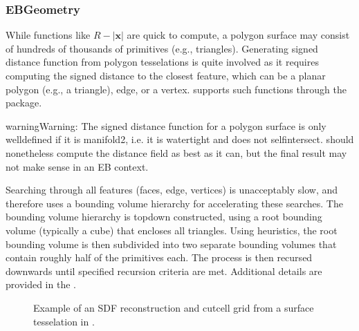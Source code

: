 \documentclass[letterpaper,10pt,english]{sphinxmanual}
\let\sphinxpxdimen\pdfpxdimen\else\newdimen\sphinxpxdimen
\begin{document}
\subsubsection{EBGeometry}
\label{\detokenize{Source/SpatialDiscretization:ebgeometry}}
While functions like \(R - \left|\mathbf{x}\right|\) are quick to compute, a polygon surface may consist of hundreds of thousands of primitives (e.g., triangles).
Generating signed distance function from polygon tesselations is quite involved as it requires computing the signed distance to the closest feature, which can be a planar polygon (e.g., a triangle), edge, or a vertex.
 supports such functions through the  package.

\begin{sphinxadmonition}{warning}{Warning:}
The signed distance function for a polygon surface is only well\sphinxhyphen{}defined if it is manifold\sphinxhyphen{}2, i.e. it is watertight and does not self\sphinxhyphen{}intersect.
 should nonetheless compute the distance field as best as it can, but the final result may not make sense in an EB context.
\end{sphinxadmonition}

Searching through all features (faces, edge, vertices) is unacceptably slow, and  therefore uses a bounding volume hierarchy for accelerating these searches.
The bounding volume hierarchy is top\sphinxhyphen{}down constructed, using a root bounding volume (typically a cube) that encloses all triangles.
Using heuristics, the root bounding volume is then subdivided into two separate bounding volumes that contain roughly half of the primitives each.
The process is then recursed downwards until specified recursion criteria are met.
Additional details are provided in the .

\begin{figure}[htb]
\centering
\capstart

\noindent\sphinxincludegraphics[width=360\sphinxpxdimen]{{Armadillo}.png}
\caption{Example of an SDF reconstruction and cut\sphinxhyphen{}cell grid from a surface tesselation in .}\label{\detokenize{Source/SpatialDiscretization:id9}}\end{figure}
\end{document}
